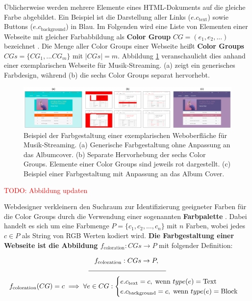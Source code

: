 Üblicherweise werden mehrere Elemente eines HTML-Dokuments auf die gleiche Farbe abgebildet. Ein Beispiel ist die Darstellung aller Links ($e.c_\text{text}$) sowie Buttons ($e.c_\text{background}$) in Blau. Im Folgenden wird eine Liste von Elementen einer Webseite mit gleicher Farbabbildung als \textbf{Color Group} $CG = (e_1, e_2, ...) $ bezeichnet \citep[siehe auch][]{webpage, patterns}. Die Menge aller Color Groups einer Webseite heißt \textbf{Color Groups} $CGs = \{CG_1, ... CG_m\}$ mit $|CGs| = m$. Abbildung \ref{fig:colorgroups} veranschaulicht dies anhand einer exemplarischen Webseite für Musik-Streaming. (a) zeigt ein generisches Farbdesign, während (b) die sechs Color Groups separat hervorhebt.

\begin{figure}[]
	\centering
	\includegraphics[width=1\textwidth]{img/color_groups.png}
	\caption{Beispiel der Farbgestaltung einer exemplarischen Weboberfläche für Musik-Streaming. (a) Generische Farbgestaltung ohne Anpassung an das Albumcover. (b) Separate Hervorhebung der sechs Color Groups. Elemente einer Color Groups sind jeweils rot dargestellt. (c) Beispiel einer Farbgestaltung mit Anpassung an das Album Cover.}
	\label{fig:colorgroups}
\end{figure}

\textcolor{red}{TODO: Abbildung updaten}

Webdesigner verkleinern den Suchraum zur Identifizierung geeigneter Farben für die Color Groups durch die Verwendung einer sogenannten \textbf{Farbpalette} \citep{webpage, webdesign, webx0}. Dabei handelt es sich um eine Farbmenge $P = \{c_1, c_2, \ldots, c_n\}$ mit $n$ Farben, wobei jedes $c \in P$ als String von RGB Werten kodiert wird. \textbf{Die Farbgestaltung einer Webseite ist die Abbildung $f_\text{coloration}: CGs \to P$} mit folgender Definition:

\begin{equation}
\begin{gathered}
  f_\text{coloration}: CGs \to P,\; \\[-1mm] 
  \mathclap{\rule{4cm}{0.4pt}}\\
  f_\text{coloration}(CG) = c \implies \forall e \in CG:
  	\begin{cases}
		e.c_\text{text} = c, \; \text{wenn } type(e) = \text{Text} \\
		e.c_\text{background} = c, \; \text{wenn } type(e) = \text{Block}
	\end{cases}
\end{gathered}
\end{equation}

